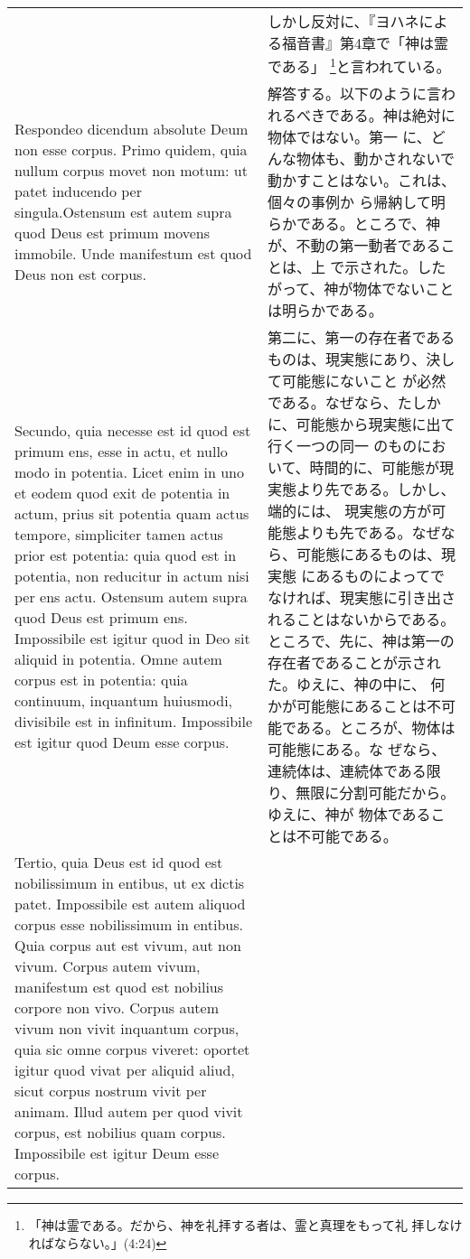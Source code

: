 \documentclass[10pt]{jsarticle}
\begin{document}
\begin{longtable}{p{21em}p{21em}}
&

しかし反対に、『ヨハネによる福音書』第4章で「神は霊である」
\footnote{「神は霊である。だから、神を礼拝する者は、霊と真理をもって礼
拝しなければならない。」(4:24)}と言われている。

\\

{\sc Respondeo dicendum} absolute Deum non esse corpus.  Primo quidem,
quia nullum corpus movet non motum: ut patet inducendo per
singula.Ostensum est autem supra quod Deus est primum movens immobile.
Unde manifestum est quod Deus non est corpus.

&

解答する。以下のように言われるべきである。神は絶対に物体ではない。第一
に、どんな物体も、動かされないで動かすことはない。これは、個々の事例か
ら帰納して明らかである。ところで、神が、不動の第一動者であることは、上
で示された。したがって、神が物体でないことは明らかである。

\\


Secundo, quia necesse est id quod est primum ens, esse in actu, et
nullo modo in potentia.  Licet enim in uno et eodem quod exit de
potentia in actum, prius sit potentia quam actus tempore, simpliciter
tamen actus prior est potentia: quia quod est in potentia, non
reducitur in actum nisi per ens actu.  Ostensum autem supra quod Deus
est primum ens.  Impossibile est igitur quod in Deo sit aliquid in
potentia.  Omne autem corpus est in potentia: quia continuum,
inquantum huiusmodi, divisibile est in infinitum.  Impossibile est
igitur quod Deum esse corpus.


&

第二に、第一の存在者であるものは、現実態にあり、決して可能態にないこと
が必然である。なぜなら、たしかに、可能態から現実態に出て行く一つの同一
のものにおいて、時間的に、可能態が現実態より先である。しかし、端的には、
現実態の方が可能態よりも先である。なぜなら、可能態にあるものは、現実態
にあるものによってでなければ、現実態に引き出されることはないからである。
ところで、先に、神は第一の存在者であることが示された。ゆえに、神の中に、
何かが可能態にあることは不可能である。ところが、物体は可能態にある。な
ぜなら、連続体は、連続体である限り、無限に分割可能だから。ゆえに、神が
物体であることは不可能である。

\\

Tertio, quia Deus est id quod est nobilissimum in entibus, ut ex
dictis patet.  Impossibile est autem aliquod corpus esse nobilissimum
in entibus.  Quia corpus aut est vivum, aut non vivum.  Corpus autem
vivum, manifestum est quod est nobilius corpore non vivo.  Corpus
autem vivum non vivit inquantum corpus, quia sic omne corpus viveret:
oportet igitur quod vivat per aliquid aliud, sicut corpus nostrum
vivit per animam.  Illud autem per quod vivit corpus, est nobilius
quam corpus.  Impossibile est igitur Deum esse corpus.


\end{longtable}
\end{document}
